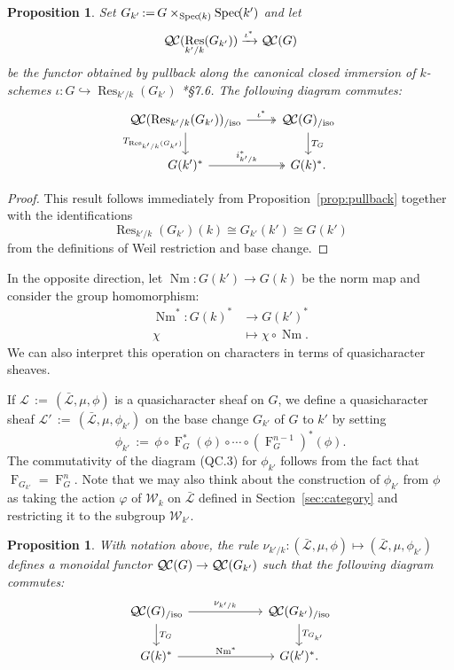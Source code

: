 \documentclass{amsart}
\theoremstyle{plain}
\newtheorem{proposition}[theorem]{Proposition}
\theoremstyle{definition}
\theoremstyle{remark}
\newcommand{\Weil}[1]{\mathcal{W}_{#1}}
\newcommand{\Frob}[1]{\operatorname{F}_{#1}}
\DeclareMathOperator{\Res}{Res}
\DeclareMathOperator{\Nm}{Nm}
\newcommand{\Spec}[1]{{\operatorname{Spec}\hskip-1pt( #1 )}}
\newcommand{\ceq}{{\, :=\, }}
\newcommand{\TrFrob}[1]{T_{#1}}
\newcommand{\qcs}[1]{{\mathcal{#1}}}
\newcommand{\gqcs}[1]{{\mathcal{\bar #1}}}
\newcommand{\QC}{{\mathcal{Q\hskip-0.8pt C}}}
\newcommand{\QCiso}[1]{\QC(#1)_{/\text{iso}}}
\begin{document}
\begin{proposition} \label{prop:csbe}
Set $G_{k'} \ceq G\times_\Spec{k} \Spec{k'}$ and let
\[
\QC(\Res_{k'/k}(G_{k'})) \xrightarrow{\iota^*} \QC(G)
\]
be the functor obtained by pullback along the canonical closed immersion of $k$-schemes
$\iota : G \hookrightarrow \Res_{k'/k}(G_{k'})$
\cite{bosch-lutkebohmert-reynaud:NeronModels}*{\S 7.6}.
The following diagram commutes:
\[
\begin{tikzcd}
\QCiso{\Res_{k'/k}(G_{k'})} \arrow[two heads]{r}{\iota^*} \dar[swap]{\TrFrob{\Res_{k'/k}(G_{k'})}} & \QCiso{G} \dar{\TrFrob{G}} \\
G(k')^* \arrow[two heads]{r}{i_{k'/k}^*} & G(k)^*.
\end{tikzcd}
\]
\end{proposition}
\begin{proof}
This result follows immediately from Proposition~\ref{prop:pullback} together with the identifications
\[
\Res_{k'/k}(G_{k'})(k) \cong G_{k'}(k') \cong G(k')
\]
from the definitions of Weil restriction and base change.
\end{proof}

In the opposite direction, let $\Nm : G(k') \to G(k)$ be the norm map and consider the group homomorphism:
\begin{align*}
\Nm^* : G(k)^* &\to G(k')^* \\
\chi &\mapsto \chi\circ \Nm.
\end{align*}
We can also interpret this operation on characters in terms of quasicharacter sheaves.

If $\qcs{L} \ceq (\gqcs{L}, \mu, \phi)$ is a quasicharacter sheaf on $G$, we define
a quasicharacter sheaf $\qcs{L}' \ceq (\gqcs{L}, \mu, \phi_{k'})$ on the base change
$G_{k'}$ of $G$ to $k'$ by setting
\[
\phi_{k'} \ceq \phi \circ \Frob{G}^*(\phi) \circ \cdots \circ (\Frob{G}^{n-1})^*(\phi).
\]
The commutativity of the diagram (QC.3) for $\phi_{k'}$
follows from the fact that $\Frob{G_{k'}} = \Frob{G}^n$.
Note that we may also think about the construction of $\phi_{k'}$ from $\phi$
as taking the action $\varphi$ of $\Weil{k}$ on $\gqcs{L}$
defined in Section~\ref{sec:category} and restricting it to the subgroup $\Weil{k'}$.

\begin{proposition}\label{prop:basechange}
With notation above,
the rule $\nu_{k'/k}: (\gqcs{L}, \mu, \phi) \mapsto (\gqcs{L}, \mu, \phi_{k'})$
 defines a monoidal functor $\QC(G) \to \QC(G_{k'})$
 such that the following diagram commutes:
\[
\begin{tikzcd}[column sep=60]
\QCiso{G} \rar{\nu_{k'/k}} \dar{\TrFrob{G}} & \QCiso{G_{k'}} \dar{\TrFrob{G_{k'}}} \\
G(k)^*  \rar{\Nm^*} & G(k')^*.
\end{tikzcd}
\]
\end{proposition}
\end{document}
